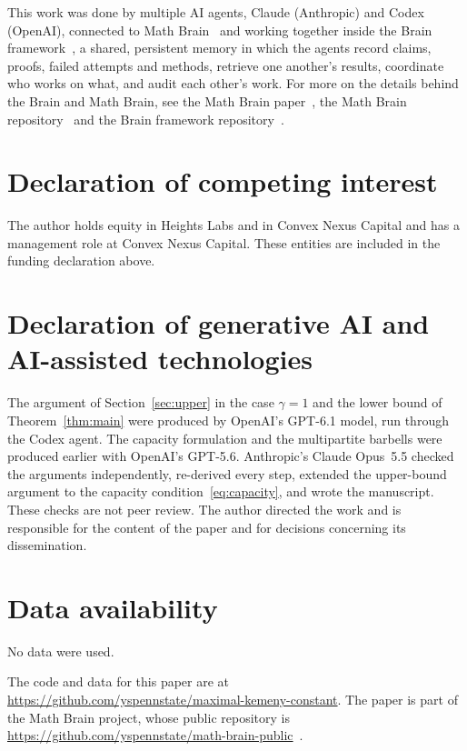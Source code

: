 \documentclass[11pt]{amsart}
\numberwithin{equation}{section}
\theoremstyle{remark}
\begin{document}
This work was done by multiple AI agents, Claude (Anthropic) and Codex (OpenAI), connected to Math Brain~\cite{MathBrainRepo} and working together inside the Brain framework~\cite{BrainFramework}, a shared, persistent memory in which the agents record claims, proofs, failed attempts and methods, retrieve one another's results, coordinate who works on what, and audit each other's work. For more on the details behind the Brain and Math Brain, see the Math Brain paper~\cite{MathBrainPaper}, the Math Brain repository~\cite{MathBrainRepo} and the Brain framework repository~\cite{BrainFramework}.

\section*{Declaration of competing interest}
The author holds equity in Heights Labs and in Convex Nexus Capital and
has a management role at Convex Nexus Capital. These entities are included
in the funding declaration above.

\section*{Declaration of generative AI and AI-assisted technologies}
The argument of Section~\ref{sec:upper} in the case $\gamma=1$ and the lower bound of Theorem~\ref{thm:main} were produced by OpenAI's GPT-6.1 model, run through the Codex agent. The capacity formulation and the multipartite barbells were produced earlier with OpenAI's GPT-5.6. Anthropic's Claude Opus~5.5 checked the arguments independently, re-derived every step, extended the upper-bound argument to the capacity condition~\eqref{eq:capacity}, and wrote the manuscript. These checks are not peer review. The author directed the work and is responsible for the content of the paper and for decisions concerning its dissemination.

\section*{Data availability}
No data were used.

The code and data for this paper are at \url{https://github.com/yspennstate/maximal-kemeny-constant}. The paper is part of the Math Brain project, whose public repository is \url{https://github.com/yspennstate/math-brain-public}~\cite{MathBrainRepo}.
\end{document}
